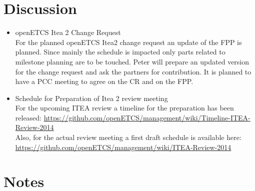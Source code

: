 \documentclass[a4paper, 11pt]{article}
\begin{document}
\section{Discussion}
\begin{itemize}
\item openETCS Itea 2 Change Request\\
For the planned openETCS Itea2 change request an update of the FPP is planned. Since mainly the schedule is impacted only parts related to milestone planning are to be touched. Peter will prepare an updated version for the change request and ask the partners for contribution. It is planned to have a PCC meeting to agree on the CR and on the FPP.

\item Schedule for Preparation of Itea 2 review meeting\\
For the upcoming ITEA review a timeline for the preparation has been released:
\url{https://github.com/openETCS/management/wiki/Timeline-ITEA-Review-2014}\\

Also, for the actual review meeting a first draft schedule is available here: \url{https://github.com/openETCS/management/wiki/ITEA-Review-2014}

\end{itemize}

\section{Notes}
\end{document}

